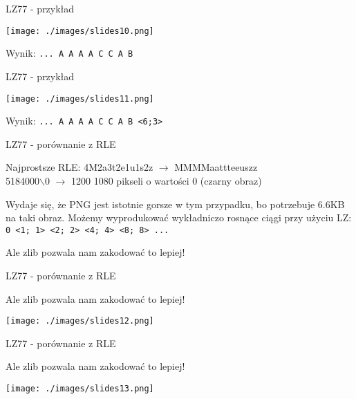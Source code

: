 \documentclass[presentation]{beamer}
\begin{document}
\begin{frame}[label={sec:org7211a5a}]{LZ77 - przykład}
\begin{center}
\texttt{[image: ./images/slides10.png]}
\end{center}
Wynik: {\color{red}\texttt{... A A A A C C A B }}
\end{frame}

\begin{frame}[label={sec:orgc35cacc}]{LZ77 - przykład}
\begin{center}
\texttt{[image: ./images/slides11.png]}
\end{center}
Wynik: {\color{red}\texttt{... A A A A C C A B <6;3> }}
\end{frame}

\begin{frame}[label={sec:orgcc6b1d5}]{LZ77 - porównanie z RLE}
\begin{block}{Najprostsze RLE:}
4M2a3t2e1u1s2z \(\rightarrow\) MMMMaattteeuszz \\
5184000$\backslash$0 \(\rightarrow\) 1200 \texttimes{} 1080 pikseli o
wartości 0 (czarny obraz) \\
\end{block}

\begin{block}{Wydaje się, że PNG jest istotnie gorsze w tym przypadku, bo potrzebuje 6.6KB na taki obraz.}
Możemy wyprodukować wykładniczo rosnące ciągi przy użyciu LZ: \texttt{0 }{\color{OliveGreen}\texttt{<1; 1> <2; 2> <4; 4> <8; 8> ...}} \\
\end{block}

\begin{block}{Ale zlib pozwala nam zakodować to lepiej!}
\end{block}
\end{frame}

\begin{frame}[label={sec:org11e725b}]{LZ77 - porównanie z RLE}
\begin{block}{Ale zlib pozwala nam zakodować to lepiej!}
\begin{center}
\texttt{[image: ./images/slides12.png]}
\end{center}
\end{block}
\end{frame}

\begin{frame}[label={sec:org7341895}]{LZ77 - porównanie z RLE}
\begin{block}{Ale zlib pozwala nam zakodować to lepiej!}
\begin{center}
\texttt{[image: ./images/slides13.png]}
\end{center}
\end{block}
\end{frame}
\end{document}
